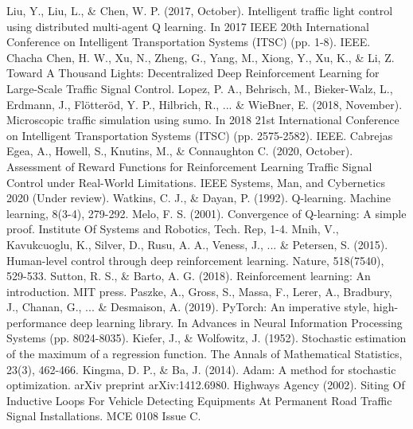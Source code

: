 \documentclass[conference]{IEEEtran}
\begin{document}
\begin{thebibliography}{1}
 Liu, Y., Liu, L., \& Chen, W. P. (2017, October). Intelligent traffic light control using distributed multi-agent Q learning. In 2017 IEEE 20th International Conference on Intelligent Transportation Systems (ITSC) (pp. 1-8). IEEE.
 Chacha Chen, H. W., Xu, N., Zheng, G., Yang, M., Xiong, Y., Xu, K., \& Li, Z. Toward A Thousand Lights: Decentralized Deep Reinforcement Learning for Large-Scale Traffic Signal Control.
 Lopez, P. A., Behrisch, M., Bieker-Walz, L., Erdmann, J., Flötteröd, Y. P., Hilbrich, R., ... \& WieBner, E. (2018, November). Microscopic traffic simulation using sumo. In 2018 21st International Conference on Intelligent Transportation Systems (ITSC) (pp. 2575-2582). IEEE.
 Cabrejas Egea, A., Howell, S., Knutins, M., \& Connaughton C. (2020, October). Assessment of Reward Functions for Reinforcement Learning Traffic Signal Control under Real-World Limitations. IEEE Systems, Man, and Cybernetics 2020 (Under review). 
 Watkins, C. J., \& Dayan, P. (1992). Q-learning. Machine learning, 8(3-4), 279-292.
 Melo, F. S. (2001). Convergence of Q-learning: A simple proof. Institute Of Systems and Robotics, Tech. Rep, 1-4.
 Mnih, V., Kavukcuoglu, K., Silver, D., Rusu, A. A., Veness, J.,  ... \& Petersen, S. (2015). Human-level control through deep reinforcement learning. Nature, 518(7540), 529-533.
 Sutton, R. S., \& Barto, A. G. (2018). Reinforcement learning: An introduction. MIT press.
 Paszke, A., Gross, S., Massa, F., Lerer, A., Bradbury, J., Chanan, G., ... \& Desmaison, A. (2019). PyTorch: An imperative style, high-performance deep learning library. In Advances in Neural Information Processing Systems (pp. 8024-8035).
 Kiefer, J., \& Wolfowitz, J. (1952). Stochastic estimation of the maximum of a regression function. The Annals of Mathematical Statistics, 23(3), 462-466.
 Kingma, D. P., \& Ba, J. (2014). Adam: A method for stochastic optimization. arXiv preprint arXiv:1412.6980.
 Highways Agency (2002). Siting Of Inductive Loops For Vehicle Detecting Equipments At Permanent Road Traffic Signal Installations. MCE 0108 Issue C.
\end{thebibliography}


\end{document}

